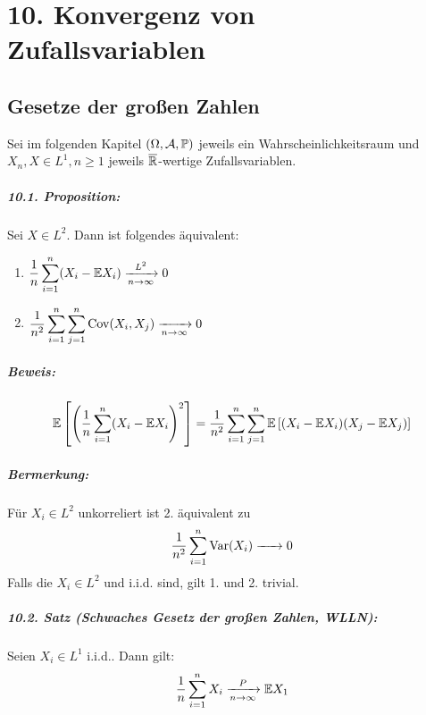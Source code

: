 \chapter*{10. Konvergenz von Zufallsvariablen}

\section*{Gesetze der gro\ss{}en Zahlen}

Sei im folgenden Kapitel $(\Omega,\mathcal{A},\mathbb{P})$ jeweils ein
Wahrscheinlichkeitsraum und $X_n,X\in L^1, n\geq1$ jeweils
$\overline{\mathbb{R}}$-wertige Zufallsvariablen.

\paragraph{10.1. Proposition:} Sei $X\in L^2$. Dann ist folgendes
\"aquivalent:
\begin{enumerate}
    \item $\dfrac{1}{n}\displaystyle\sum_{i=1}^n(X_i-\E X_i)\nto{L^2}{n\to\infty}0$
	\item $\dfrac{1}{n^2}\displaystyle\sum_{i=1}^n\sum_{j=1}^n\operatorname{Cov}(X_i,X_j)\nto{}{n\to\infty}0$
\end{enumerate}

\paragraph{Beweis:} 
\begin{equation*}
    \mathbb{E}\left[\left(\dfrac{1}{n}\sum_{i=1}^n(X_i-\mathbb{E} X_i\right)^2\right]=\dfrac{1}{n^2}\sum_{i=1}^n\sum_{j=1}^n\mathbb{E}\left[(X_i-\mathbb{E} X_i)(X_j-\mathbb{E} X_j)\right]
\end{equation*}


\paragraph{Bermerkung:} F\"ur $X_i\in L^2$ unkorreliert ist 2. \"aquivalent zu $$\dfrac{1}{n^2}\sum_{i=1}^n\Var(X_i)\nto{}{}0$$ Falls die $X_i\in L^2$ und i.i.d. sind, gilt 1. und 2. trivial.


\paragraph{10.2. Satz (Schwaches Gesetz der gro\ss{}en Zahlen, WLLN):} Seien $X_i\in L^1$ i.i.d.. Dann gilt: 
    $$\dfrac{1}{n}\sum_{i=1}^nX_i\nto{P}{n\to\infty}\E X_1$$ 

